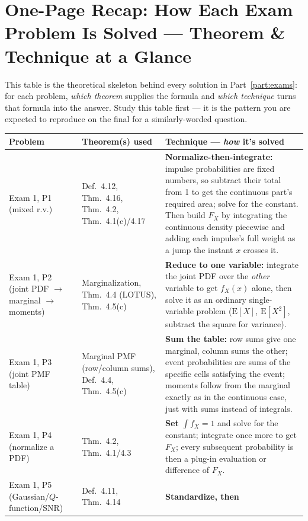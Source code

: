 \documentclass[10pt]{article}
\newcommand{\E}[1]{\mathrm{E}\left[#1\right]}
\begin{document}
\clearpage
\section*{One-Page Recap: How Each Exam Problem Is Solved --- Theorem \& Technique at a Glance}

\noindent This table is the theoretical skeleton behind every solution in
Part~\ref{part:exams}: for each problem, \emph{which theorem} supplies the formula and
\emph{which technique} turns that formula into the answer. Study this table first --- it is
the pattern you are expected to reproduce on the final for a similarly-worded question.

{\small
\begin{longtable}{@{}p{2.5cm}p{4.7cm}p{6.4cm}@{}}
\toprule
\textbf{Problem} & \textbf{Theorem(s) used} & \textbf{Technique --- \emph{how} it's solved}\\
\midrule
\endhead
Exam 1, P1 (mixed r.v.) & Def.\ 4.12, Thm.\ 4.16, Thm.\ 4.2, Thm.\ 4.1(c)/4.17 &
\textbf{Normalize-then-integrate:} impulse probabilities are fixed numbers, so subtract their
total from 1 to get the continuous part's required area; solve for the constant. Then build
$F_X$ by integrating the continuous density piecewise and adding each impulse's full weight as
a jump the instant $x$ crosses it.\\[4pt]
Exam 1, P2 (joint PDF $\to$ marginal $\to$ moments) & Marginalization, Thm.\ 4.4 (LOTUS),
Thm.\ 4.5(c) & \textbf{Reduce to one variable:} integrate the joint PDF over the \emph{other}
variable to get $f_X(x)$ alone, then solve it as an ordinary single-variable problem
($\E{X}$, $\E{X^2}$, subtract the square for variance).\\[4pt]
Exam 1, P3 (joint PMF table) & Marginal PMF (row/column sums), Def.\ 4.4, Thm.\ 4.5(c) &
\textbf{Sum the table:} row sums give one marginal, column sums the other; event probabilities
are sums of the specific cells satisfying the event; moments follow from the marginal exactly
as in the continuous case, just with sums instead of integrals.\\[4pt]
Exam 1, P4 (normalize a PDF) & Thm.\ 4.2, Thm.\ 4.1/4.3 & \textbf{Set $\int f_X=1$} and solve
for the constant; integrate once more to get $F_X$; every subsequent probability is then a
plug-in evaluation or difference of $F_X$.\\[4pt]
Exam 1, P5 (Gaussian/$Q$-function/SNR) & Def.\ 4.11, Thm.\ 4.14 & \textbf{Standardize, then
}
\end{longtable}}
\end{document}
